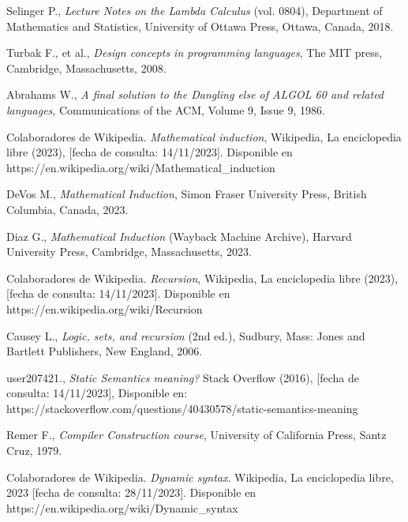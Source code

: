 \begin{thebibliography}{11}
     \bibitem{}
     \label{sec:88}
     \hypertarget{88}{}
     Selinger P., \textit{Lecture Notes on the Lambda Calculus} (vol. 0804), Department of Mathematics and Statistics, University of Ottawa Press, Ottawa, Canada, 2018.%

     \bibitem{}
     \label{sec:89}
     \hypertarget{89}{}
     Turbak F., et al.,  \textit{Design concepts in programming languages}, The MIT press, Cambridge, Massachusetts, 2008.%

     \bibitem{}
     \label{sec:90}
     \hypertarget{90}{}
     Abrahams W., \textit{A final solution to the Dangling else of ALGOL 60 and related languages}, Communications of the ACM, Volume 9, Issue 9, 1986.%

    \bibitem{}
    \label{sec:91}
    \hypertarget{91}{}
    Colaboradores de Wikipedia. \textit{Mathematical induction}, Wikipedia, La enciclopedia libre (2023), [fecha de consulta: 14/11/2023]. Disponible en https://en.wikipedia.org/wiki/Mathematical\_induction

    \bibitem{}
    \label{sec:92}
    \hypertarget{92}{}
    DeVos M., \textit{Mathematical Induction}, Simon Fraser University Press, British Columbia, Canada, 2023.

    \bibitem{}
    \label{sec:93}
    \hypertarget{93}{}
    Diaz G., \textit{Mathematical Induction} (Wayback Machine Archive), Harvard University Press, Cambridge, Massachusetts, 2023. 

    \bibitem{}
    \label{sec:94}
    \hypertarget{94}{}
    Colaboradores de Wikipedia. \textit{Recursion}, Wikipedia, La enciclopedia libre (2023), [fecha de consulta: 14/11/2023]. Disponible en https://en.wikipedia.org/wiki/Recursion

    \bibitem{}
    \label{sec:95}
    \hypertarget{95}{}
    Causey L., \textit{Logic, sets, and recursion} (2nd ed.), Sudbury, Mass: Jones and Bartlett Publishers, New England, 2006.

    \bibitem{}
    \label{sec:96}
    \hypertarget{96}{}
    user207421., \textit{Static Semantics meaning?} Stack Overflow (2016), [fecha de consulta: 14/11/2023], Disponible en: https://stackoverflow.com/questions/40430578/static-semantics-meaning

    \bibitem{}
    \label{sec:97}
    \hypertarget{97}{}
    Remer F., \textit{Compiler Construction course}, University of California Press, Santz Cruz, 1979.

    \bibitem{}
    \label{sec:98}
    \hypertarget{98}{}
    Colaboradores de Wikipedia. \textit{Dynamic syntax}. Wikipedia, La enciclopedia libre, 2023 [fecha de consulta: 28/11/2023]. Disponible en https://en.wikipedia.org/wiki/Dynamic\_syntax


\end{thebibliography}

